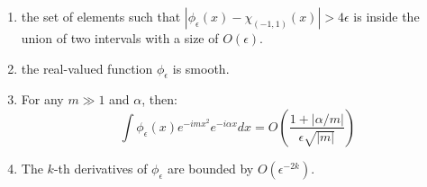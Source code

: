 \documentclass{article}
\begin{document}
\begin{enumerate}
    \item the set of elements such that $|\phi_{\epsilon}(x)-\chi_{(-1,1)}(x)| > 4\epsilon$ is inside the union of two intervals with a size of $O(\epsilon)$.
    
    \item the real-valued function $\phi_{\epsilon}$ is smooth.
    
    \item For any $m\gg1$ and $\alpha$, then:
    \begin{equation}\label{Tm-property}
        \int \phi_{\epsilon}(x)e^{-imx^2}e^{-i\alpha x}dx=O\left(\frac{1+|\alpha/m|}{\epsilon \sqrt{|m|}}\right)
    \end{equation}
    \item The $k$-th derivatives of $\phi_\epsilon$ are bounded by $O(\epsilon^{-2k})$.
\end{enumerate}
\end{document}
